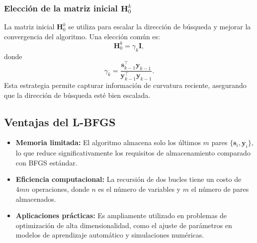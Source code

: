 \subsubsection{Elección de la matriz inicial $\mathbf{H}_0^k$}

La matriz inicial $\mathbf{H}_0^k$ se utiliza para escalar la dirección de búsqueda y mejorar la convergencia del algoritmo. Una elección común es:
\begin{equation}
\label{eq:scaling-h0}
\mathbf{H}_0^k = \gamma_k \mathbf{I},
\end{equation}
donde
\begin{equation}
\gamma_k = \frac{\mathbf{s}_{k-1}^\top \mathbf{y}_{k-1}}{\mathbf{y}_{k-1}^\top \mathbf{y}_{k-1}}.
\end{equation}
Esta estrategia permite capturar información de curvatura reciente, asegurando que la dirección de búsqueda esté bien escalada.

\subsection{Ventajas del L-BFGS}

\begin{itemize}
	\item \textbf{Memoria limitada:} El algoritmo almacena solo los últimos $m$ pares $\{\mathbf{s}_i, \mathbf{y}_i\}$, lo que reduce significativamente los requisitos de almacenamiento comparado con BFGS estándar.
	\item \textbf{Eficiencia computacional:} La recursión de dos bucles tiene un costo de $4mn$ operaciones, donde $n$ es el número de variables y $m$ el número de pares almacenados.
	\item \textbf{Aplicaciones prácticas:} Es ampliamente utilizado en problemas de optimización de alta dimensionalidad, como el ajuste de parámetros en modelos de aprendizaje automático y simulaciones numéricas.
\end{itemize}

\endinput
